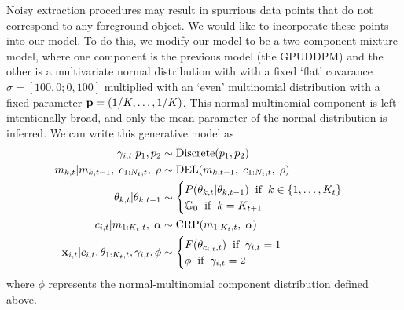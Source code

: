 \documentclass[smallcondensed, final]{svjour3}
\begin{document}
Noisy extraction procedures may result in spurrious data points that do not correspond to any foreground object. We would like to incorporate these points into our model. To do this, we modify our model to be a two component mixture model, where one component is the previous model (the GPUDDPM) and the other is a multivariate normal distribution with with a fixed `flat' covarance $\sigma = [100, 0; 0, 100]$ multiplied with an `even' multinomial distribution with a fixed parameter $\bold{p} = (1/K, \ldots, 1/K)$. This normal-multinomial component is left intentionally broad, and only the mean parameter of the normal distribution is inferred. We can write this generative model as
\begin{align}
\label{background_model}
\begin{split}
\gamma_{i,t} | p_{1}, p_{2} &\sim \text{Discrete}(p_{1}, p_{2})\\
m_{k,t} | m_{k,t-1}, \hspace{1mm} c_{1:N_{t}, t}, \hspace{1mm} \rho  &\sim \text{DEL}(m_{k,t-1}, \hspace{1mm} c_{1:N_{t}, t}, \hspace{1mm} \rho) \\
\theta_{k, t} | \theta_{k, t-1}   &\sim
\begin{cases}
	P(\theta_{k, t} | \theta_{k, t-1}) \hspace{2mm} \text{if} \hspace{2mm} k \in \{ 1, \ldots, K_{t} \} \\
	\mathbb{G}_{0}   \hspace{2mm} \text{if} \hspace{2mm} k = K_{t+1}
\end{cases} \\
c_{i,t} | m_{1:K_{t},t}, \hspace{1mm} \alpha  &\sim  \text{CRP} (m_{1:K_{t},t}, \hspace{1mm} \alpha) \\
\bold{x}_{i,t} | c_{i,t}, \theta_{1:K_{t}, t}, \gamma_{i,t}, \phi &\sim
\begin{cases}
	F(\theta_{c_{i,t}, t}) \hspace{2mm} \text{if} \hspace{2mm} \gamma_{i,t} = 1 \\
	\phi \hspace{2mm} \text{if} \hspace{2mm} \gamma_{i,t} = 2
\end{cases} \\
\end{split}
\end{align}
where $\phi$ represents the normal-multinomial component distribution defined above.
\end{document}
